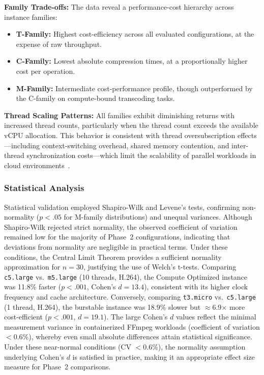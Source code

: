 \documentclass[conference]{IEEEtran}
\begin{document}
\textbf{Family Trade-offs:} The data reveal a performance-cost hierarchy across
instance families:
\begin{itemize}
	\item \textbf{T-Family:} Highest cost-efficiency across all evaluated
	configurations, at the expense of raw throughput.
	\item \textbf{C-Family:} Lowest absolute compression times, at a
	proportionally higher cost per operation.
	\item \textbf{M-Family:} Intermediate cost-performance profile, though
	outperformed by the C-family on compute-bound transcoding tasks.
\end{itemize}

\textbf{Thread Scaling Patterns:} All families exhibit diminishing returns
with increased thread counts, particularly when the thread count exceeds the
available vCPU allocation. This behavior is consistent with thread
oversubscription effects---including context-switching overhead, shared memory
contention, and inter-thread synchronization costs---which limit the
scalability of parallel workloads in cloud environments~\cite{b1}.

\subsubsection{Statistical Analysis}

Statistical validation employed Shapiro-Wilk and Levene's tests, confirming
non-normality ($p < .05$ for M-family distributions) and unequal variances.
Although Shapiro-Wilk rejected strict normality, the observed coefficient of
variation remained low for the majority of Phase~2 configurations, indicating
that deviations from normality are negligible in practical terms. Under these
conditions, the Central Limit Theorem provides a sufficient normality
approximation for $n=30$, justifying the use of Welch's t-tests. Comparing \texttt{c5.large}
vs.\ \texttt{m5.large} (10 threads, H.264), the Compute Optimized instance was
11.8\% faster ($p < .001$, Cohen's $d = 13.4$), consistent with its higher
clock frequency and cache architecture. Conversely, comparing \texttt{t3.micro}
vs.\ \texttt{c5.large} (1 thread, H.264), the burstable instance was 18.9\%
slower but $\approx$6.9$\times$ more cost-efficient ($p < .001$, $d = 19.1$). The large
Cohen's $d$ values reflect the minimal measurement variance in containerized
FFmpeg workloads (coefficient of variation $< 0.6\%$), whereby even small
absolute differences attain statistical significance. Under these near-normal
conditions (CV $< 0.6\%$), the normality assumption underlying Cohen's $d$ is
satisfied in practice, making it an appropriate effect size measure for
Phase~2 comparisons.
\end{document}
